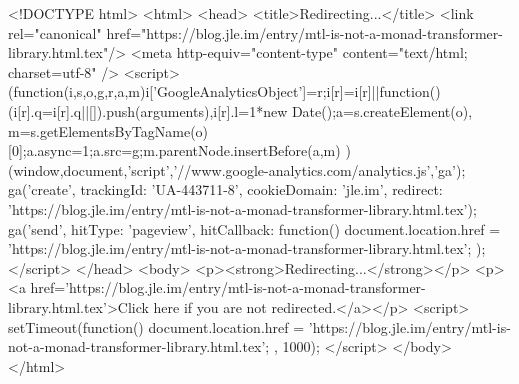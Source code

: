 <!DOCTYPE html>
<html>
<head>
<title>Redirecting...</title>
<link rel="canonical" href="https://blog.jle.im/entry/mtl-is-not-a-monad-transformer-library.html.tex"/>
<meta http-equiv="content-type" content="text/html; charset=utf-8" />
<script>
(function(i,s,o,g,r,a,m){i['GoogleAnalyticsObject']=r;i[r]=i[r]||function(){
(i[r].q=i[r].q||[]).push(arguments)},i[r].l=1*new Date();a=s.createElement(o),
m=s.getElementsByTagName(o)[0];a.async=1;a.src=g;m.parentNode.insertBefore(a,m)
})(window,document,'script','//www.google-analytics.com/analytics.js','ga');
ga('create', { trackingId: 'UA-443711-8', cookieDomain: 'jle.im', redirect: 'https://blog.jle.im/entry/mtl-is-not-a-monad-transformer-library.html.tex'});
ga('send', { hitType: 'pageview', hitCallback: function() { document.location.href = 'https://blog.jle.im/entry/mtl-is-not-a-monad-transformer-library.html.tex'; } });
</script>
</head>
<body>
  <p><strong>Redirecting...</strong></p>
  <p><a href='https://blog.jle.im/entry/mtl-is-not-a-monad-transformer-library.html.tex'>Click here if you are not redirected.</a></p>
  <script>
    setTimeout(function() { document.location.href = 'https://blog.jle.im/entry/mtl-is-not-a-monad-transformer-library.html.tex'; }, 1000);
  </script>
</body>
</html>
